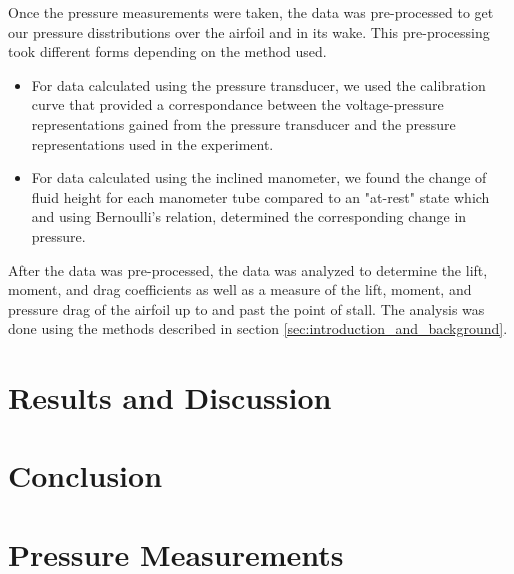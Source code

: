 \documentclass[runningheads]{llncs}
\begin{document}
Once the pressure measurements were taken, the data was pre-processed to get our pressure disstributions over the airfoil and in its wake. This pre-processing took different forms depending on the method used.

\begin{itemize}

    \item For data calculated using the pressure transducer, we used the calibration curve that provided a correspondance between the voltage-pressure representations gained from the pressure transducer and the pressure representations used in the experiment.

    \item For data calculated using the inclined manometer, we found the change of fluid height for each manometer tube compared to an "at-rest" state which and using Bernoulli's relation, determined the corresponding change in pressure.

\end{itemize}

After the data was pre-processed, the data was analyzed to determine the lift, moment, and drag coefficients as well as a measure of the lift, moment, and pressure drag of the airfoil up to and past the point of stall. The analysis was done using the methods described in section \ref{sec:introduction_and_background}.




\section{Results and Discussion}




\section{Conclusion}










\appendix
\section{Pressure Measurements}
\end{document}
